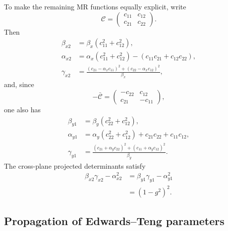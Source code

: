 \documentclass[11pt,a4paper]{article}
\begin{document}
To make the remaining MR functions equally explicit, write
\begin{equation}
 \mathcal C=
 \begin{pmatrix}
  c_{11}&c_{12}\\c_{21}&c_{22}
 \end{pmatrix}.
 \label{eq:c-components}
\end{equation}
Then
\begin{align}
 \beta_{x2}
 &=\beta_x(c_{11}^2+c_{12}^2),
 \label{eq:betax2-et}\\
 \alpha_{x2}
 &=\alpha_x(c_{11}^2+c_{12}^2)
   -(c_{11}c_{21}+c_{12}c_{22}),
 \label{eq:alphax2-et}\\
 \gamma_{x2}
 &=\frac{
  (c_{21}-\alpha_xc_{11})^2
  +(c_{22}-\alpha_xc_{12})^2
 }{\beta_x},
 \label{eq:gammax2-et}
\end{align}
and, since
\begin{equation}
 -\bar{\mathcal C}
 =
 \begin{pmatrix}
  -c_{22}&c_{12}\\
  c_{21}&-c_{11}
 \end{pmatrix},
\end{equation}
one also has
\begin{align}
 \beta_{y1}
 &=\beta_y(c_{22}^2+c_{12}^2),
 \label{eq:betay1-et}\\
 \alpha_{y1}
 &=\alpha_y(c_{22}^2+c_{12}^2)
   +c_{21}c_{22}+c_{11}c_{12},
 \label{eq:alphay1-et}\\
 \gamma_{y1}
 &=\frac{
  (c_{21}+\alpha_yc_{22})^2
  +(c_{11}+\alpha_yc_{12})^2
 }{\beta_y}.
 \label{eq:gammay1-et}
\end{align}
The cross-plane projected determinants satisfy
\begin{equation}
 \begin{aligned}
 \beta_{x2}\gamma_{x2}-\alpha_{x2}^2
 &=\beta_{y1}\gamma_{y1}-\alpha_{y1}^2\\
 &=(1-g^2)^2.
 \end{aligned}
 \label{eq:cross-determinants}
\end{equation}

\subsection{Propagation of Edwards--Teng parameters}
\label{sec:et-propagation}
\end{document}
